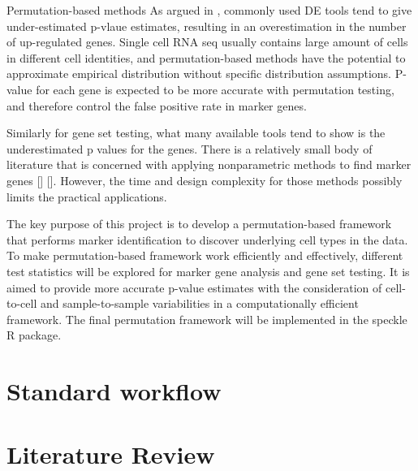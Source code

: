 Permutation-based methods  
As argued in , commonly used DE tools tend to give under-estimated p-vlaue estimates, resulting in an overestimation in the number of up-regulated genes.  
Single cell RNA seq usually contains large amount of cells in different cell identities, and permutation-based methods have the potential to approximate empirical distribution without specific distribution assumptions. P-value for each gene is expected to be more accurate with permutation testing, and therefore control the false positive rate in marker genes. 

Similarly for gene set testing, what many available tools tend to show is the underestimated p values for the genes. 
There is a relatively small body of literature that is concerned with applying nonparametric methods to find marker genes [] []. However, the time and design complexity for those methods possibly limits the practical applications. 

The key purpose of this project is to develop a permutation-based framework that performs marker identification to discover underlying cell types in the data. 
To make permutation-based framework work efficiently and effectively, different test statistics will be explored for marker gene analysis and gene set testing. It is aimed to provide more accurate p-value estimates with the consideration of cell-to-cell and sample-to-sample variabilities in a computationally efficient framework. The final permutation framework will be implemented in the speckle R package. 

\section{Standard workflow}

\section{Literature Review}





